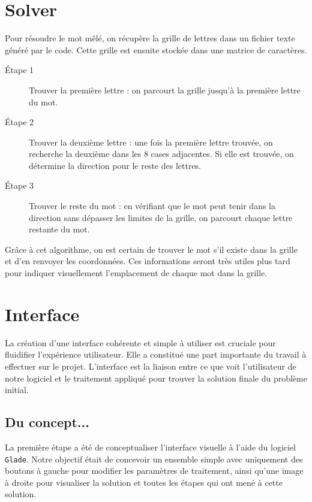 \documentclass{article}
\begin{document}
\section{Solver}
Pour résoudre le mot mêlé, on récupère la grille de lettres dans un fichier texte généré par le code. Cette grille est ensuite stockée dans une matrice de caractères.

\begin{description}
    \item[Étape 1] Trouver la première lettre : on parcourt la grille jusqu'à la première lettre du mot.
    
    \item[Étape 2] Trouver la deuxième lettre : une fois la première lettre trouvée, on recherche la deuxième dans les 8 cases adjacentes. Si elle est trouvée, on détermine la direction pour le reste des lettres.
    
    \item[Étape 3] Trouver le reste du mot : en vérifiant que le mot peut tenir dans la direction sans dépasser les limites de la grille, on parcourt chaque lettre restante du mot.
\end{description}

Grâce à cet algorithme, on est certain de trouver le mot s'il existe dans la grille et d'en renvoyer les coordonnées. Ces informations seront très utiles plus tard pour indiquer visuellement l'emplacement de chaque mot dans la grille.
\clearpage

\section{Interface}
La création d'une interface cohérente et simple à utiliser est cruciale pour fluidifier l'expérience utilisateur. Elle a constitué une part importante du travail à effectuer sur le projet. L'interface est la liaison entre ce que voit l'utilisateur de notre logiciel et le traitement appliqué pour trouver la solution finale du problème initial.\\

\subsection{Du concept...}
La première étape a été de conceptualiser l'interface visuelle à l'aide du logiciel \texttt{Glade}. Notre objectif était de concevoir un ensemble simple avec uniquement des boutons à gauche pour modifier les paramètres de traitement, ainsi qu'une image à droite pour visualiser la solution et toutes les étapes qui ont mené à cette solution.\\
\end{document}

